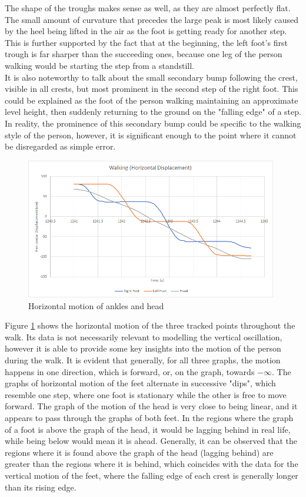 \documentclass[12pt, a4paper]{article}
\begin{document}
The shape of the troughs makes sense as well, as they are almost perfectly flat.
The small amount of curvature that precedes the large peak is most likely caused
by the heel being lifted in the air as the foot is getting ready for another
step. This is further supported by the fact that at the beginning, the left
foot's first trough is far sharper than the succeeding ones, because one leg of
the person walking would be starting the step from a standstill. \\

It is also noteworthy to talk about the small secondary bump following the
crest, visible in all crests, but most prominent in the second step of the right
foot. This could be explained as the foot of the person walking maintaining an
approximate level height, then suddenly returning to the ground on the
"falling edge" of a step. In reality, the prominence of this secondary bump
could be specific to the walking style of the person, however, it is significant
enough to the point where it cannot be disregarded as simple error.

\begin{figure}[H]
    \centering
    \includegraphics[width=11cm]{motion_horiz.png}
    \caption{Horizontal motion of ankles and head}
    \label{horiz}
\end{figure}

Figure \ref{horiz} shows the horizontal motion of the three tracked points
throughout the walk. Its data is not necessarily relevant to modelling the
vertical oscillation, however it is able to provide some key insights into the
motion of the person during the walk. It is evident that generally, for all
three graphs, the motion happens in one direction, which is forward, or, on the
graph, towards $-\infty$. The graphs of horizontal motion of the feet alternate
in successive "dips", which resemble one step, where one foot is stationary
while the other is free to move forward. The graph of the motion of the head is
very close to being linear, and it appears to pass through the graphs of both
feet. In the regions where the graph of a foot is above the graph of the head,
it would be lagging behind in real life, while being below would mean it is
ahead. Generally, it can be observed that the regions where it is found above
the graph of the head (lagging behind) are greater than the regions where it is
behind, which coincides with the data for the vertical motion of the feet, where
the falling edge of each crest is generally longer than its rising edge.
\end{document}
